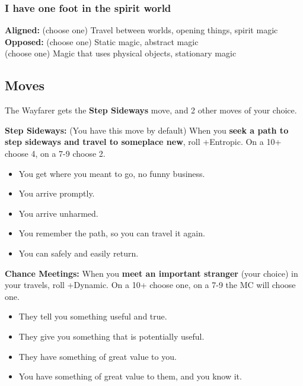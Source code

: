 \documentclass[10pt,twoside,openright]{memoir}
\begin{document}
\hypertarget{i-have-one-foot-in-the-spirit-world}{%
\subsubsection{I have one foot in the spirit
world}\label{i-have-one-foot-in-the-spirit-world}}

\textbf{Aligned:} (choose one) Travel between worlds, opening things,
spirit magic\\
\textbf{Opposed:} (choose one) Static magic, abstract magic\\
(choose one) Magic that uses physical objects, stationary magic

\hypertarget{moves-8}{%
\subsection{Moves}\label{moves-8}}

The Wayfarer gets the \textbf{Step Sideways} move, and 2 other moves of
your choice.

\textbf{Step Sideways:} (You have this move by default) When you
\textbf{seek a path to step sideways and travel to someplace new}, roll
+Entropic. On a 10+ choose 4, on a 7-9 choose 2.

\begin{itemize}
\tightlist
\item
  You get where you meant to go, no funny business.
\item
  You arrive promptly.
\item
  You arrive unharmed.
\item
  You remember the path, so you can travel it again.
\item
  You can safely and easily return.
\end{itemize}

\textbf{Chance Meetings:} When you \textbf{meet an important stranger}
(your choice) in your travels, roll +Dynamic. On a 10+ choose one, on a
7-9 the MC will choose one.

\begin{itemize}
\tightlist
\item
  They tell you something useful and true.
\item
  They give you something that is potentially useful.
\item
  They have something of great value to you.
\item
  You have something of great value to them, and you know it.
\end{itemize}
\end{document}
